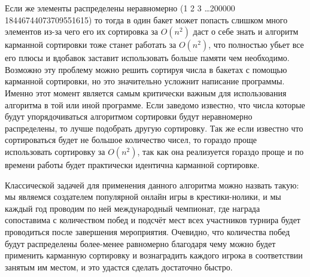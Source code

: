 \documentclass[12pt]{article}
\begin{document}
\begin{enumerate}
Если же элементы распределены неравномерно (1 2 3 \ldots 200000 18446744073709551615) то тогда в один бакет может попасть слишком много элементов из-за чего его их сортировка за $O(n^2)$ даст о себе знать и алгоритм карманной сортировки тоже станет работать за $O(n^2)$, что полностью убьет все его плюсы и вдобавок заставит использовать больше памяти чем необходимо.
Возможно эту проблему можно решить сортируя числа в бакетах с помощью карманной сортировки, но это значительно усложнит написание программы.
Именно этот момент является самым критически важным для использования алгоритма в той или иной программе.
Если заведомо известно, что числа которые будут упорядочиваться алгоритмом сортировки будут неравномерно распределены, то лучше подобрать другую сортировку.
Так же если известно что сортироваться будет не большое количество чисел, то гораздо проще использовать сортировку за $O(n^2)$, так как она реализуется гораздо проще и по времени работы будет практически идентична карманной сортировке.
\end{enumerate}

Классической задачей для применения данного алгоритма можно назвать такую: мы являемся создателем популярной онлайн игры в крестики-нолики, и мы каждый год проводим по ней международный чемпионат, где награда сопоставима с количеством побед и подсчёт мест всех участников турнира будет проводиться после завершения мероприятия. 
Очевидно, что количества побед будут распределены более-менее равномерно благодаря чему можно будет применить карманную сортировку и вознаградить каждого игрока в соответствии занятым им местом, и это удастся сделать достаточно быстро.
\end{document}
